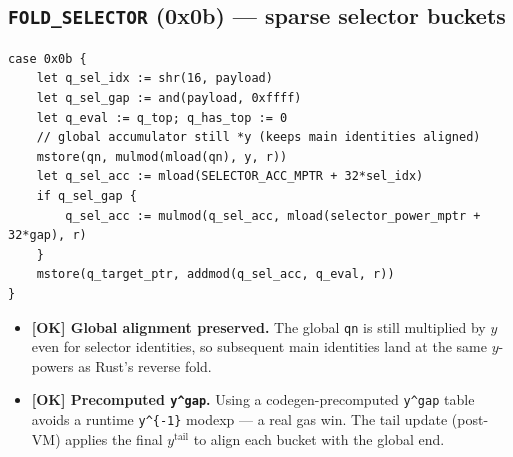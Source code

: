 \subsection{\texttt{FOLD\_SELECTOR} (0x0b) --- sparse selector buckets}
\begin{lstlisting}[style=yul]
case 0x0b {
    let q_sel_idx := shr(16, payload)
    let q_sel_gap := and(payload, 0xffff)
    let q_eval := q_top; q_has_top := 0
    // global accumulator still *y (keeps main identities aligned)
    mstore(qn, mulmod(mload(qn), y, r))
    let q_sel_acc := mload(SELECTOR_ACC_MPTR + 32*sel_idx)
    if q_sel_gap {
        q_sel_acc := mulmod(q_sel_acc, mload(selector_power_mptr + 32*gap), r)
    }
    mstore(q_target_ptr, addmod(q_sel_acc, q_eval, r))
}
\end{lstlisting}
\begin{itemize}
  \item \textcolor{tracegreen}{\textbf{[OK] Global alignment preserved.}}
        The global \texttt{qn} is still multiplied by $y$ even for
        selector identities, so subsequent main identities land at the
        same $y$-powers as Rust's reverse fold.
  \item \textcolor{tracegreen}{\textbf{[OK] Precomputed \texttt{y\textasciicircum gap}.}}
        Using a codegen-precomputed \texttt{y\textasciicircum gap} table
        avoids a runtime \texttt{y\textasciicircum\{-1\}} modexp --- a
        real gas win. The tail update (post-VM) applies the final
        $y^{\text{tail}}$ to align each bucket with the global end.
\end{itemize}

